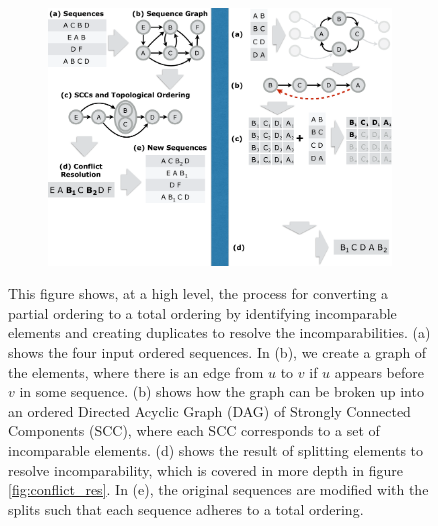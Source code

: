 \begin{figure}[t!] 
\begin{minipage}{1\linewidth}
\begin{subfigure}[c]{0.96\linewidth}
\includegraphics[trim={0 6cm 19.2cm 0}, clip, width=\linewidth]{figures/partial_ordering}
\end{subfigure} 
\end{minipage} 
\caption{This figure shows, at a high level, the process for converting a partial ordering to a total ordering by identifying incomparable elements and creating duplicates to resolve the incomparabilities. (a) shows the four input ordered sequences. In (b), we create a graph of the elements, where there is an edge from $u$ to $v$ if $u$ appears before $v$ in some sequence. (b) shows how the graph can be broken up into an ordered Directed Acyclic Graph (DAG) of Strongly Connected Components (SCC), where each SCC corresponds to a set of incomparable elements. (d) shows the result of splitting elements to resolve incomparability, which is covered in more depth in figure \ref{fig:conflict_res}. In (e), the original sequences are modified with the splits such that each sequence adheres to a total ordering.}
\label{fig:ordering}
\end{figure}




